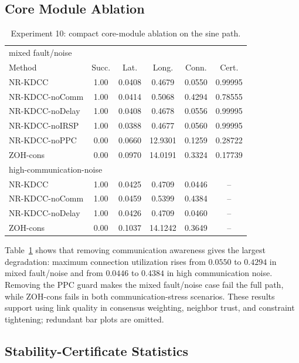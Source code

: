 \documentclass[twocolumn,3p,times,procedia]{elsarticle}
\newcommand{\Method}{NR-KDCC}
\newcommand{\ZOHcons}{ZOH-cons}
\begin{document}
\subsection{Core Module Ablation}

\begin{table}[!tbp]
\centering
\caption{Experiment 10: compact core-module ablation on the sine path.}
\label{tab:e2_ablation}
\scriptsize
\setlength{\tabcolsep}{2.2pt}
\begin{tabular}{lccccc}
\toprule
\multicolumn{6}{l}{mixed fault/noise}\\
Method & Succ. & Lat. & Long. & Conn. & Cert.\\
\midrule
\Method{} & 1.00 & 0.0408 & 0.4679 & 0.0550 & 0.99995\\
\Method{}-noComm & 1.00 & 0.0414 & 0.5068 & 0.4294 & 0.78555\\
\Method{}-noDelay & 1.00 & 0.0408 & 0.4678 & 0.0556 & 0.99995\\
\Method{}-noIRSP & 1.00 & 0.0388 & 0.4677 & 0.0560 & 0.99995\\
\Method{}-noPPC & 0.00 & 0.0660 & 12.9301 & 0.1259 & 0.28722\\
\ZOHcons{} & 0.00 & 0.0970 & 14.0191 & 0.3324 & 0.17739\\
\midrule
\multicolumn{6}{l}{high-communication-noise}\\
\Method{} & 1.00 & 0.0425 & 0.4709 & 0.0446 & --\\
\Method{}-noComm & 1.00 & 0.0459 & 0.5399 & 0.4384 & --\\
\Method{}-noDelay & 1.00 & 0.0426 & 0.4709 & 0.0460 & --\\
\ZOHcons{} & 0.00 & 0.1037 & 14.1242 & 0.3649 & --\\
\bottomrule
\end{tabular}
\end{table}

Table~\ref{tab:e2_ablation} shows that removing communication awareness gives the largest degradation: maximum connection utilization rises from $0.0550$ to $0.4294$ in mixed fault/noise and from $0.0446$ to $0.4384$ in high communication noise. Removing the PPC guard makes the mixed fault/noise case fail the full path, while \ZOHcons{} fails in both communication-stress scenarios. These results support using link quality in consensus weighting, neighbor trust, and constraint tightening; redundant bar plots are omitted.

\subsection{Stability-Certificate Statistics}
\end{document}
